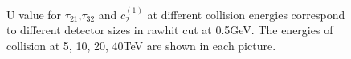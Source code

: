 \begin{figure}
\begin{center}
\end{center}
\caption{U value for $\tau_{21}$,$\tau_{32}$ and $c_2^{(1)}$ at different collision energies correspond to different detector sizes in rawhit cut at 0.5GeV. The energies of collision at 5, 10, 20, 40TeV are shown in each picture.}
\label{fig:raw_U_summary}
\end{figure}

